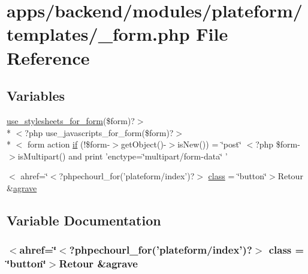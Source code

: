 \hypertarget{backend_2modules_2plateform_2templates_2__form_8php}{\section{apps/backend/modules/plateform/templates/\-\_\-form.php File Reference}
\label{backend_2modules_2plateform_2templates_2__form_8php}
}
\subsection*{Variables}
\begin{DoxyCompactItemize}
\item 
\hyperlink{live_2modules_2user_2templates_2__form_8php_a86bc4522fdbe625b07bc4a4d6eec3df7}{use\-\_\-stylesheets\-\_\-for\-\_\-form}(\$form)?$>$\\*
$<$?php use\-\_\-javascripts\-\_\-for\-\_\-form(\$form)?$>$\\*
$<$ form action \hyperlink{backend_2modules_2plateform_2templates_2__form_8php_abd1acf0179bbb4a56e04d4fccdbc121f}{if} (!\$form-\/$>$get\-Object()-\/$>$is\-New()) = \char`\"{}post\char`\"{} $<$?php \$form-\/$>$is\-Multipart() and print 'enctype=\char`\"{}multipart/form-\/data\char`\"{} '
\item 
$<$ ahref=\char`\"{}$<$?phpechourl\-\_\-for('plateform/index')?$>$ \hyperlink{backend_2modules_2plateform_2templates_2__form_8php_a5cfc8cad8ae3e6ce308e452b4dca4da3}{class} = \char`\"{}button\char`\"{}$>$Retour \&\hyperlink{presse_2modules_2page_2templates_2concours_ouikos_success_8php_adcbedde811e3c81b65c252edf38caea2}{agrave}
\end{DoxyCompactItemize}


\subsection{Variable Documentation}
\hypertarget{backend_2modules_2plateform_2templates_2__form_8php_a5cfc8cad8ae3e6ce308e452b4dca4da3}{
\subsubsection[{class}]{\setlength{\rightskip}{0pt plus 5cm}$<$ahref=\char`\"{}$<$?phpechourl\-\_\-for('plateform/index')?$>$ class = \char`\"{}button\char`\"{}$>$Retour \&{\bf agrave}}}\label{backend_2modules_2plateform_2templates_2__form_8php_a5cfc8cad8ae3e6ce308e452b4dca4da3}


